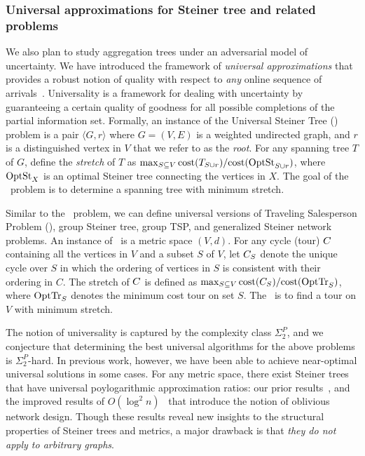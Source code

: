 \subsubsection{Universal approximations for Steiner tree and related problems}
\label{sec:ust}
We also plan to study aggregation trees under an adversarial model of
uncertainty.  We have introduced the framework of {\em universal
  approximations}\/ that provides a robust notion of quality with
respect to {\em any} online sequence of
arrivals~\cite{jia+lnrs:universal}.  Universality is a framework for
dealing with uncertainty by guaranteeing a certain quality of goodness
for all possible completions of the partial information set.
Formally, an instance of the Universal Steiner Tree (\ust) problem is
a pair $\langle G , r\rangle$ where $G = (V,E)$ is a weighted
undirected graph, and $r$ is a distinguished vertex in $V$ that we
refer to as the {\em root}.  For any spanning tree $T$ of $G$, define
the {\em stretch}\/ of $T$ as $\max_{S \subseteq V}\mbox{cost}(T_{S\cup
    r})/\mbox{cost}(\mbox{OptSt}_{S\cup r})$, where $\mbox{OptSt}_{X}$ is an optimal
Steiner tree connecting the vertices in $X$.  The goal of the
\ust\ problem is to determine a spanning tree with minimum stretch.

Similar to the \ust\ problem, we can define universal versions of
Traveling Salesperson Problem (\utsp), group Steiner tree, group TSP,
and generalized Steiner network problems.  An instance of \utsp\ is a
metric space $(V,d)$.  For any cycle (tour) $C$ containing all the
vertices in $V$ and a subset $S$ of $V$, let $C_S$ denote the unique
cycle over $S$ in which the ordering of vertices in $S$ is consistent
with their ordering in $C$.  The stretch of $C$ is defined as
$\max_{S\subseteq V} \mbox{cost}(C_{S})/\mbox{cost}(\mbox{OptTr}_{S})$, where $\mbox{OptTr}_{S}$
denotes the minimum cost tour on set $S$. The \utsp\ is to find a tour
on $V$ with minimum stretch.


The notion of universality is captured by the complexity class
$\Sigma_2^P$, and we conjecture that determining the best universal
algorithms for the above problems is $\Sigma^P_2$-hard.  In previous
work, however, we have been able to achieve near-optimal universal
solutions in some cases.  For any metric space, there exist Steiner
trees that have universal poylogarithmic approximation ratios: our
prior results~\cite{jia+lnrs:universal}, and the improved results of
$O(\log^2 n)$~\cite{gupta+hr:oblivious} that introduce the notion of
oblivious network design.  Though these results reveal new insights to
the structural properties of Steiner trees and metrics, a major
drawback is that {\em they do not apply to arbitrary graphs}.


